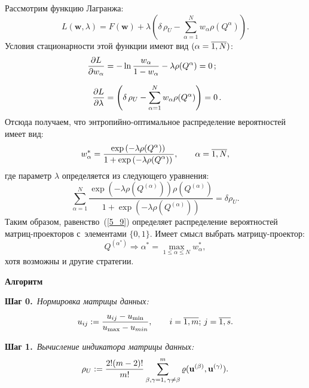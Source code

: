 \begin{multicols}{2}
Рассмотрим функцию Лагранжа:
\begin{equation*}
L(\mathbf{w}, \lambda) = F(\mathbf{w}) + \lambda \left(\delta\,\rho_U - 
\sum\limits^N_{\alpha=1} w_{\alpha} \rho(Q^{\alpha})\right).
\end{equation*}
Условия стационарности этой функции имеют вид $(\alpha \hm= \overline{1,N})$:
\begin{align*}
\!\displaystyle\displaystyle\frac{\displaystyle \partial L\mathstrut}{\displaystyle \partial w_{\alpha}\mathstrut} &= - \ln \displaystyle\frac{\displaystyle w_{\alpha}\mathstrut}{\displaystyle 1 - w_{\alpha}\mathstrut} 
- \lambda \rho(Q^{\alpha}) = 0\,;\\[6pt]
\!\displaystyle\displaystyle\frac{\displaystyle \partial L\mathstrut}{\displaystyle \partial \lambda\mathstrut} &= \displaystyle\left(\delta\,\rho_U - 
\sum\limits^N_{\alpha=1} w_{\alpha} \rho(Q^{\alpha})\right) = 0\,.
\end{align*}
Отсюда получаем, что энтропийно-оптимальное распределение вероятностей имеет 
вид:
\begin{equation}
\label{5_9}
w^*_{\alpha} = \displaystyle\frac{\displaystyle \exp\left(- \lambda \rho(Q^{\alpha}) \right)\mathstrut}{\displaystyle 1 + 
\exp\left(- \lambda \rho(Q^{\alpha}) \right)\mathstrut},\qquad \alpha = \overline{1,N},
\end{equation}
где параметр $\lambda$ определяется из следующего уравнения:
\begin{equation*}
\sum\limits^N_{\alpha=1}\frac{\exp(- \lambda \rho(Q^{(\alpha)})) 
\rho(Q^{(\alpha)})}{1 + \exp(- \lambda  \rho(Q^{(\alpha)}))} = \delta \rho_U.
\end{equation*}
Таким образом, равенство~(\ref{5_9}) определяет распределение вероятностей 
мат\-риц-про\-ек\-то\-ров с~элементами $\{0,1\}$. Имеет смысл выбрать 
мат\-ри\-цу-про\-ектор:
\begin{equation*}
Q^{(\alpha^*)} \Rightarrow \alpha^* = \max_{1 \le \alpha \le N} w^*_{\alpha},
\end{equation*}
хотя возможны и другие стратегии.

\begin{center}
\textbf{Алгоритм}
\end{center}

\noindent
\textbf{Шаг 0.}\ \textit{Нормировка матрицы данных:}
$$
u_{ij} := \displaystyle\frac{\displaystyle u_{ij} - u_{\min}\mathstrut}{\displaystyle u_{\max} - u_{min}\mathstrut},\qquad i = 
\overline{1,m};\,j = \overline{1,s}.
$$

\noindent
\textbf{Шаг 1.}\ \textit{Вычисление индикатора матрицы данных:}
$$
\rho_U := \displaystyle\frac{\displaystyle 2!(m-2)!\mathstrut}{\displaystyle m!\mathstrut} \sum\limits^m_{\beta, \gamma = 1,\,\gamma \ne 
\beta} \varrho(\mathbf{u}^{(\beta)}, \mathbf{u}^{(\gamma)}).
$$



\end{multicols}
